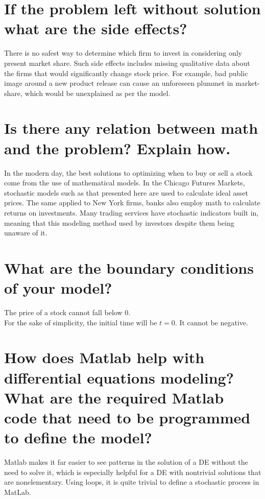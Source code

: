 \documentclass[12pt, A4]{article}
\begin{document}
		\section{If the problem left without solution what are the side effects?}
			There is no safest way to determine which firm to invest in considering only present market share. Such side effects includes missing qualitative data about the firms that would significantly change stock price. For example, bad public image around a new product release can cause an unforeseen plummet in market-share, which would be unexplained as per the model. 
		\section{Is there any relation between math and the problem? Explain how.}
			In the modern day, the best solutions to optimizing when to buy or sell a stock come from the use of mathematical models. In the Chicago Futures Markets, stochastic models such as that presented here are used to calculate ideal asset prices. The same applied to New York firms, banks also employ math to calculate returns on investments. Many trading services have stochastic indicators built in, meaning that this modeling method used by investors despite them being unaware of it.
		\section{What are the boundary conditions of your model?}
			The price of a stock cannot fall below 0. \\
			For the sake of simplicity, the initial time will be \(t = 0\). It cannot be negative.
		\section{How does Matlab help with differential equations modeling? What are the required Matlab code that need to be programmed to define the model?}
			Matlab makes it far easier to see patterns in the solution of a DE without the need to solve it, which is especially helpful for a DE with nontrivial solutions that are nonelementary. Using loops, it is quite trivial to define a stochastic process in MatLab.
\end{document}
